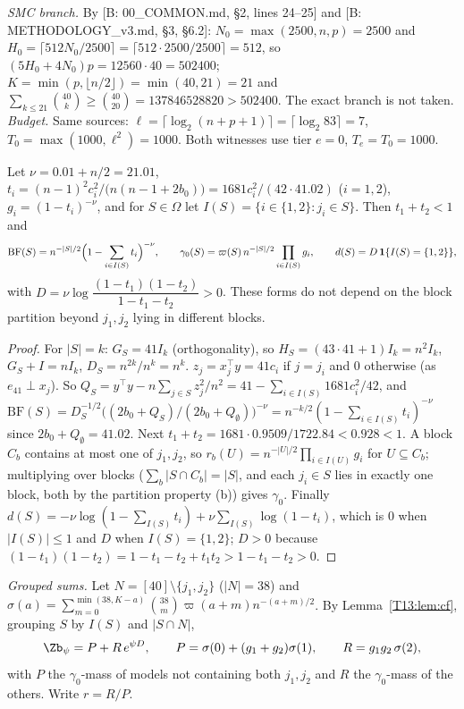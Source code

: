 \documentclass[11pt]{report}
\begin{document}
\emph{SMC branch.} By [B: 00\_COMMON.md, \S2, lines 24--25] and [B: METHODOLOGY\_v3.md, \S3, \S6.2]: $N_0=\max(2500,n,p)=2500$ and $H_0=\lceil512N_0/2500\rceil=\lceil512\cdot2500/2500\rceil=512$, so $(5H_0+4N_0)p=12560\cdot40=502400$; $K=\min(p,\lfloor n/2\rfloor)=\min(40,21)=21$ and $\sum_{k\le21}\binom{40}k\ge\binom{40}{20}=137846528820>502400$. The exact branch is not taken.
\emph{Budget.} Same sources: $\ell=\lceil\log_2(n+p+1)\rceil=\lceil\log_2 83\rceil=7$, $T_0=\max(1000,\ell^2)=1000$. Both witnesses use tier $e=0$, $T_e=T_0=1000$.

\begin{T13lemma}\label{T13:lem:cf}
Let $\nu=0.01+n/2=21.01$, $t_i=(n-1)^2c_i^2/\bigl(n(n-1+2b_0)\bigr)=1681c_i^2/(42\cdot41.02)$ ($i=1,2$), $g_i=(1-t_i)^{-\nu}$, and for $S\in\Omega$ let $I(S)=\{i\in\{1,2\}:j_i\in S\}$. Then $t_1+t_2<1$ and
\[
\mathrm{BF}(S)=n^{-|S|/2}\Bigl(1-\sum_{i\in I(S)}t_i\Bigr)^{-\nu},\qquad
\gamma_0(S)=\varpi(S)\,n^{-|S|/2}\prod_{i\in I(S)}g_i,\qquad
d(S)=D\,\mathbf 1\{I(S)=\{1,2\}\},
\]
with $D=\nu\log\dfrac{(1-t_1)(1-t_2)}{1-t_1-t_2}>0$. These forms do not depend on the block partition beyond $j_1,j_2$ lying in different blocks.
\end{T13lemma}
\begin{proof}
For $|S|=k$: $G_S=41I_k$ (orthogonality), so $H_S=(43\cdot41+1)I_k=n^2I_k$, $G_S+I=nI_k$, $D_S=n^{2k}/n^k=n^k$. $z_j=x_j^\top y=41c_i$ if $j=j_i$ and $0$ otherwise (as $e_{41}\perp x_j$). So $Q_S=y^\top y-n\sum_{j\in S}z_j^2/n^2=41-\sum_{i\in I(S)}1681c_i^2/42$, and
$\mathrm{BF}(S)=D_S^{-1/2}\bigl((2b_0+Q_S)/(2b_0+Q_\emptyset)\bigr)^{-\nu}=n^{-k/2}(1-\sum_{i\in I(S)}t_i)^{-\nu}$ since $2b_0+Q_\emptyset=41.02$. Next $t_1+t_2=1681\cdot0.9509/1722.84<0.928<1$. A block $C_b$ contains at most one of $j_1,j_2$, so $r_b(U)=n^{-|U|/2}\prod_{i\in I(U)}g_i$ for $U\subseteq C_b$; multiplying over blocks ($\sum_b|S\cap C_b|=|S|$, and each $j_i\in S$ lies in exactly one block, both by the partition property (b)) gives $\gamma_0$. Finally $d(S)=-\nu\log(1-\sum_{I(S)}t_i)+\nu\sum_{I(S)}\log(1-t_i)$, which is $0$ when $|I(S)|\le1$ and $D$ when $I(S)=\{1,2\}$; $D>0$ because $(1-t_1)(1-t_2)=1-t_1-t_2+t_1t_2>1-t_1-t_2>0$.
\end{proof}

\emph{Grouped sums.} Let $N=[40]\setminus\{j_1,j_2\}$ ($|N|=38$) and $\sigma(a)=\sum_{m=0}^{\min(38,K-a)}\binom{38}{m}\varpi(a+m)n^{-(a+m)/2}$. By Lemma~\ref{T13:lem:cf}, grouping $S$ by $I(S)$ and $|S\cap N|$,
\[
\Zb_\psi=P+R\,e^{\psi D},\qquad P=\sigma(0)+(g_1+g_2)\sigma(1),\qquad R=g_1g_2\,\sigma(2),
\]
with $P$ the $\gamma_0$-mass of models not containing both $j_1,j_2$ and $R$ the $\gamma_0$-mass of the others. Write $r=R/P$.
\end{document}
